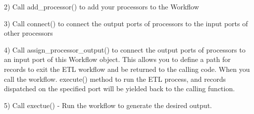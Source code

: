 \begin{DoxyVerb}
 2) Call add_processor() to add your processors to the Workflow

 3) Call connect() to connect the output ports of processors to the
    input ports of other processors

 4) Call assign_processor_output() to connect the output ports of
    processors to an input port of this Workflow object.  This allows
    you to define a path for records to exit the ETL workflow and
    be returned to the calling code.  When you call the workflow.
    execute() method to run the ETL process, and records dispatched
    on the specified port will be yielded back to the calling function.

  5) Call exectue() - Run the workflow to generate the desired output. 
\end{DoxyVerb}
 

